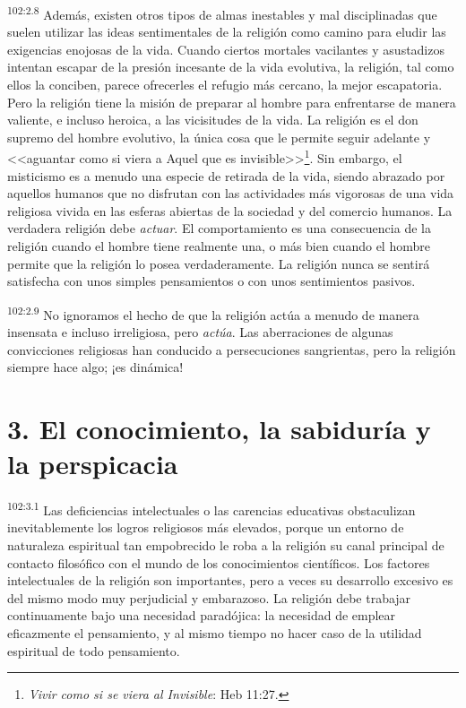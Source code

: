 \par
\textsuperscript{102:2.8} Además, existen otros tipos de almas inestables y mal disciplinadas que suelen utilizar las ideas sentimentales de la religión como camino para eludir las exigencias enojosas de la vida. Cuando ciertos mortales vacilantes y asustadizos intentan escapar de la presión incesante de la vida evolutiva, la religión, tal como ellos la conciben, parece ofrecerles el refugio más cercano, la mejor escapatoria. Pero la religión tiene la misión de preparar al hombre para enfrentarse de manera valiente, e incluso heroica, a las vicisitudes de la vida. La religión es el don supremo del hombre evolutivo, la única cosa que le permite seguir adelante y <<aguantar como si viera a Aquel que es invisible>>\footnote{\textit{Vivir como si se viera al Invisible}: Heb 11:27.}. Sin embargo, el misticismo es a menudo una especie de retirada de la vida, siendo abrazado por aquellos humanos que no disfrutan con las actividades más vigorosas de una vida religiosa vivida en las esferas abiertas de la sociedad y del comercio humanos. La verdadera religión debe \textit{actuar}. El comportamiento es una consecuencia de la religión cuando el hombre tiene realmente una, o más bien cuando el hombre permite que la religión lo posea verdaderamente. La religión nunca se sentirá satisfecha con unos simples pensamientos o con unos sentimientos pasivos.

\par
\textsuperscript{102:2.9} No ignoramos el hecho de que la religión actúa a menudo de manera insensata e incluso irreligiosa, pero \textit{actúa}. Las aberraciones de algunas convicciones religiosas han conducido a persecuciones sangrientas, pero la religión siempre hace algo; ¡es dinámica!

\section*{3. El conocimiento, la sabiduría y la perspicacia}
\par
\textsuperscript{102:3.1} Las deficiencias intelectuales o las carencias educativas obstaculizan inevitablemente los logros religiosos más elevados, porque un entorno de naturaleza espiritual tan empobrecido le roba a la religión su canal principal de contacto filosófico con el mundo de los conocimientos científicos. Los factores intelectuales de la religión son importantes, pero a veces su desarrollo excesivo es del mismo modo muy perjudicial y embarazoso. La religión debe trabajar continuamente bajo una necesidad paradójica: la necesidad de emplear eficazmente el pensamiento, y al mismo tiempo no hacer caso de la utilidad espiritual de todo pensamiento.

